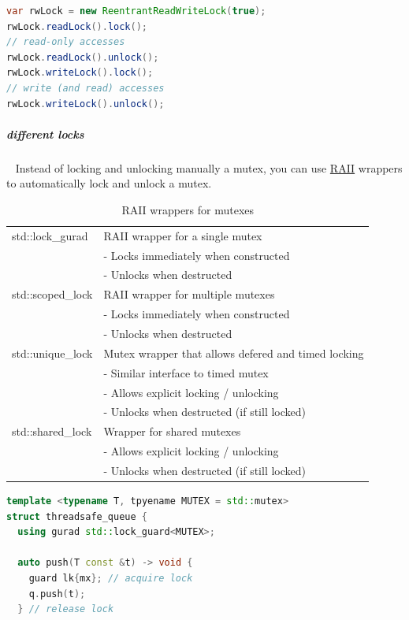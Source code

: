 \documentclass[11pt,twoside,landscape]{article}
\begin{document}
\begin{multicols}{2}
\begin{lstlisting}[language=java,numbers=none]
var rwLock = new ReentrantReadWriteLock(true);
rwLock.readLock().lock();
// read-only accesses
rwLock.readLock().unlock();
rwLock.writeLock().lock();
// write (and read) accesses
rwLock.writeLock().unlock();
\end{lstlisting}

\subparagraph{different locks} \
\label{sec:orge1d7a9d}
Instead of locking and unlocking manually a mutex, you can use \href{../../../roam/20220118172628-resource_acquisition_is_initialization.org}{RAII} wrappers to automatically lock and unlock a mutex.

\begin{table}[htbp]
\caption{\label{tab:org349b4d1}RAII wrappers for mutexes}
\centering
\begin{tabular}{|l|l|}
\hline
std::lock\_gurad & RAII wrapper for a single mutex \\
 & - Locks immediately when constructed \\
 & - Unlocks when destructed \\
\hline
std::scoped\_lock & RAII wrapper for multiple mutexes \\
 & - Locks immediately when constructed \\
 & - Unlocks when destructed \\
\hline
std::unique\_lock & Mutex wrapper that allows defered and timed locking \\
 & - Similar interface to timed mutex \\
 & - Allows explicit locking / unlocking \\
 & - Unlocks when destructed (if still locked) \\
\hline
std::shared\_lock & Wrapper for shared mutexes \\
 & - Allows explicit locking / unlocking \\
 & - Unlocks when destructed (if still locked) \\
\hline
\end{tabular}
\end{table}


\begin{lstlisting}[language=c++,label=lst:orgc5b3018,caption={Example usage for RAII wrappers},captionpos=b,numbers=none]
template <typename T, tpyename MUTEX = std::mutex>
struct threadsafe_queue {
  using gurad std::lock_guard<MUTEX>;

  auto push(T const &t) -> void {
    guard lk{mx}; // acquire lock
    q.push(t);
  } // release lock


\end{lstlisting}
\end{multicols}
\end{document}
